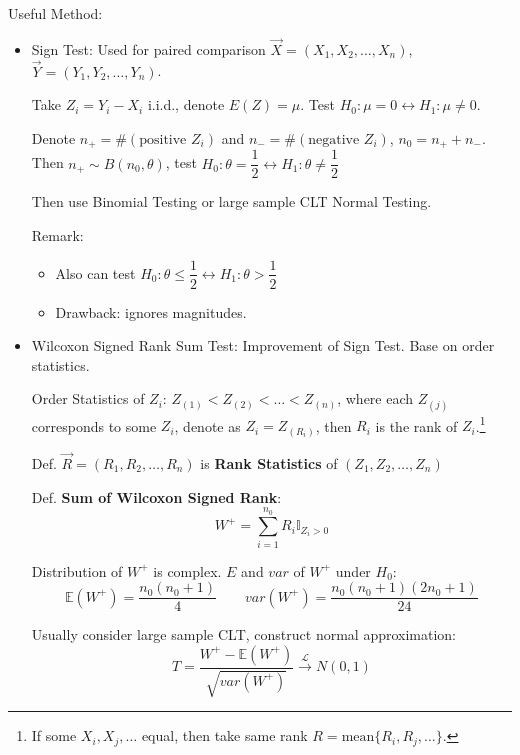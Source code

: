     Useful Method:
    \begin{itemize}
        \item Sign Test: Used for paired comparison $\vec{X}=(X_1,X_2,\ldots,X_n)$, $\vec{Y}=(Y_1,Y_2,\ldots,Y_n)$.
        
        Take $Z_i=Y_i-X_i$ i.i.d., denote $E(Z)=\mu$. Test $H_0:\mu=0\longleftrightarrow H_1:\mu\neq 0$.

        Denote $n_+=\#(\text{positive } Z_i)$ and $n_-=\#(\text{negative }Z_i)$, $n_0=n_++n_-$. Then $n_+\sim B(n_0,\theta)$, test $H_0:\theta=\dfrac{1}{2}\longleftrightarrow H_1:\theta\neq\dfrac{1}{2}$
        
        Then use Binomial Testing or large sample CLT Normal Testing.

        Remark:
        \begin{itemize}
            \item Also can test $H_0:\theta\leq\dfrac{1}{2}\longleftrightarrow H_1:\theta>\dfrac{1}{2}$
            \item Drawback: ignores magnitudes.
        \end{itemize}
        
        \item {}Wilcoxon Signed Rank Sum Test: Improvement of Sign Test. Base on order statistics.
        
        Order Statistics of $Z_i$: $Z_{(1)}<Z_{(2)}<\ldots<Z_{(n)}$, where each $Z_{(j)}$ corresponds to some $Z_i$, denote as $Z_i=Z_{(R_i)}$, then $R_i$ is the rank of $Z_i$.\footnote{If some $X_i,X_j,\ldots$ equal, then take same rank $R=\mathrm{mean}\{R_i,R_j,\ldots\}$.}
        
        Def. $\vec{R}=(R_1,R_2,\ldots,R_n)$ is \textbf{Rank Statistics} of $(Z_1,Z_2,\ldots,Z_n)$

        Def. \textbf{Sum of Wilcoxon Signed Rank}: 
        \begin{equation}
        W^+=\sum_{i=1}^{n_0}R_i\mathbb{I}_{Z_i>0} 
        \end{equation}

        Distribution of $W^+$ is complex. $E$ and $var$ of $W^+$ under $H_0$:
        \begin{equation}
            \mathbb{E}(W^+)=\frac{n_0(n_0+1)}{4}\qquad var(W^+)=\frac{n_0(n_0+1)(2n_0+1)}{24}    
        \end{equation}

        Usually consider large sample CLT, construct normal approximation:
        \begin{equation}
            T=\frac{W^+-\mathbb{E}(W^+)}{\sqrt{var(W^+)}}\xrightarrow[]{\mathscr{L}}N(0,1)
        \end{equation}


\end{itemize}

